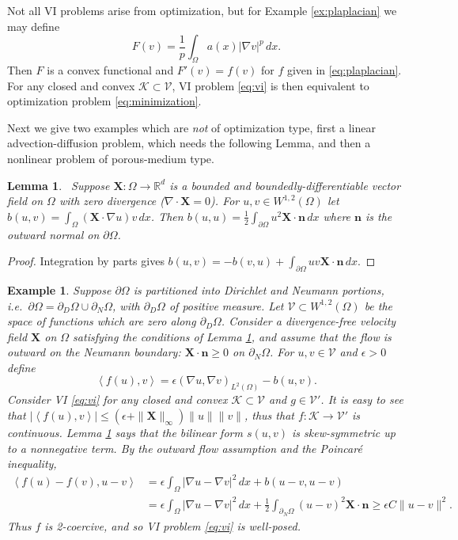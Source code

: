 \documentclass[letterpaper,final,12pt,reqno]{amsart}
\theoremstyle{cstyle}
\newtheorem{lemma}[theorem]{Lemma}
\theoremstyle{cstyle*}
\theoremstyle{dstyle}
\newtheorem{example}[theorem]{Example}
\numberwithin{equation}{section}
\numberwithin{figure}{section}
\numberwithin{table}{section}
\numberwithin{theorem}{section}
\newcommand{\eps}{\epsilon}
\newcommand{\RR}{\mathbb{R}}
\newcommand{\grad}{\nabla}
\newcommand{\Div}{\nabla\cdot}
\newcommand{\bn}{\mathbf{n}}
\newcommand{\bX}{\mathbf{X}}
\newcommand{\cK}{\mathcal{K}}
\newcommand{\cV}{\mathcal{V}}
\newcommand{\ip}[2]{\left<#1,#2\right>}
\begin{document}
Not all VI problems arise from optimization, but for Example \ref{ex:plaplacian} we may define
\begin{equation}
F(v) = \frac{1}{p} \int_\Omega a(x) |\grad v|^p\,dx. \label{eq:plaplacianobjective}
\end{equation}
Then $F$ is a convex functional and $F'(v) = f(v)$ for $f$ given in \eqref{eq:plaplacian}.  For any closed and convex $\cK\subset \cV$, VI problem \eqref{eq:vi} is then equivalent to optimization problem \eqref{eq:minimization}.

Next we give two examples which are \emph{not} of optimization type, first a linear advection-diffusion problem, which needs the following Lemma, and then a nonlinear problem of porous-medium type.

\begin{lemma}  \label{lem:advectionskew}  \cite{Elmanetal2014}\,  Suppose $\bX :\Omega \to \RR^d$ is a bounded and boundedly-differentiable vector field on $\Omega$ with zero divergence ($\Div \bX=0$).  For $u,v \in W^{1,2}(\Omega)$ let $b(u,v) = \int_\Omega (\bX \cdot \grad u) v\,dx$.  Then $b(u,u) = \frac{1}{2} \int_{\partial \Omega} u^2 \bX\cdot \bn\,dx$ where $\bn$ is the outward normal on $\partial \Omega$.
\end{lemma}

\begin{proof}
Integration by parts gives $b(u,v) = - b(v,u) + \int_{\partial \Omega} uv \bX\cdot \bn\,dx$.
\end{proof}

\begin{example}  \label{ex:advectiondiffusion}  Suppose $\partial\Omega$ is partitioned into Dirichlet and Neumann portions, i.e.~$\partial\Omega = \partial_D\Omega \cup \partial_N\Omega$, with $\partial_D\Omega$ of positive measure.  Let $\cV \subset W^{1,2}(\Omega)$ be the space of functions which are zero along $\partial_D\Omega$.  Consider a divergence-free velocity field $\bX$ on $\Omega$ satisfying the conditions of Lemma \ref{lem:advectionskew}, and assume that the flow is outward on the Neumann boundary: $\bX \cdot \bn \ge 0$ on $\partial_N\Omega$.  For $u,v \in \cV$ and $\eps>0$ define
\begin{equation}
\ip{f(u)}{v} = \eps \left(\grad u, \grad v\right)_{L^2(\Omega)} - b(u,v). \label{eq:advectiondiffusion}
\end{equation}
Consider VI \eqref{eq:vi} for any closed and convex $\cK \subset \cV$ and $g\in\cV'$.  It is easy to see that $|\ip{f(u)}{v}| \le (\eps + \|\bX\|_\infty) \|u\| \|v\|$, thus that $f:\cK \to \cV'$ is continuous.  Lemma \ref{lem:advectionskew} says that the bilinear form $s(u,v)$ is skew-symmetric up to a nonnegative term.  By the outward flow assumption and the Poincar\'e inequality,
\begin{align*}
\ip{f(u)-f(v)}{u-v} &= \eps \int_\Omega |\grad u - \grad v|^2\,dx + b(u-v,u-v) \\
                    &= \eps \int_\Omega |\grad u - \grad v|^2\,dx + \frac{1}{2} \int_{\partial_N\Omega} (u-v)^2 \bX\cdot\bn \ge \eps C \|u-v\|^2.
\end{align*}
Thus $f$ is 2-coercive, and so VI problem \eqref{eq:vi} is well-posed.
\end{example}
\end{document}
